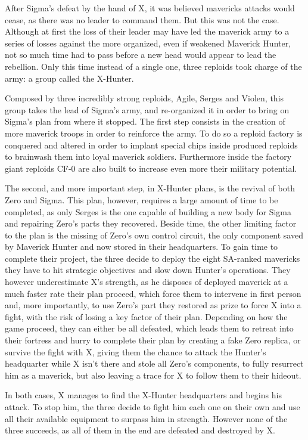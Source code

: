 After Sigma's defeat by the hand of X, it was believed mavericks attacks would cease, as there was no leader to command them. But this was not the case. Although at first the loss of their leader may have led the maverick army to a series of losses against the more organized, even if weakened Maverick Hunter, not so much time had to pass before a new head would appear to lead the rebellion. Only this time instead of a single one, three reploids took charge of the army: a group called the X-Hunter.

Composed by three incredibly strong reploids, Agile, Serges and Violen, this group takes the lead of Sigma's army, and re-organized it in order to bring on Sigma's plan from where it stopped. The first step consists in the creation of more maverick troops in order to reinforce the army. To do so a reploid factory is conquered and altered in order to implant special chips inside produced reploids to brainwash them into loyal maverick soldiers. Furthermore inside the factory giant reploids CF-0 are also built to increase even more their military potential.

The second, and more important step, in X-Hunter plans, is the revival of both Zero and Sigma. This plan, however, requires a large amount of time to be completed, as only Serges is the one capable of building a new body for Sigma and repairing Zero's parts they recovered. Beside time, the other limiting factor to the plan is the missing of Zero's own control circuit, the only component saved by Maverick Hunter and now stored in their headquarters. To gain time to complete their project, the three decide to deploy the eight SA-ranked mavericks they have to hit strategic objectives and slow down Hunter's operations. They however underestimate X's strength, as he disposes of deployed maverick at a much faster rate their plan proceed, which force them to intervene in first person and, more importantly, to use Zero's part they restored  as prize to force X into a fight, with the risk of losing a key factor of their plan. Depending on how the game proceed, they can either be all defeated, which leads them to retreat into their fortress and hurry to complete their plan by creating a fake Zero replica, or survive the fight with X, giving them the chance to attack the Hunter's headquarter while X isn't there and stole all Zero's components, to fully resurrect him as a maverick, but also leaving a trace for X to follow them to their hideout.

In both cases, X manages to find the X-Hunter headquarters and begins his attack. To stop him, the three decide to fight him each one on their own and use all their available equipment to surpass him in strength. However none of the three succeeds, as all of them in the end are defeated and destroyed by X.


